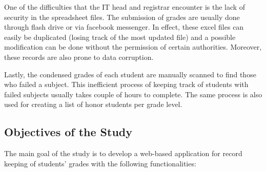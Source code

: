 \documentclass[11pt,a4paper,titlepage]{article}
\begin{document}
One of the difficulties that the IT head and registrar encounter is the lack of security in the spreadsheet files. The submission of grades are usually done through flash drive or via facebook messenger. In effect, these excel files can easily be duplicated (losing track of the most updated file) and a possible modification can be done without the permission of certain authorities. Moreover, these records are also prone to data corruption.

Lastly, the condensed grades of each student are manually scanned to find those who failed a subject. This inefficient process of keeping track of students with failed subjects usually takes couple of hours to complete. The same process is also used for creating a list of honor students per grade level. 






\subsection{Objectives of the Study}
The main goal of the study is to develop a web-based application for record keeping of students' grades with the following functionalities:
\end{document}
